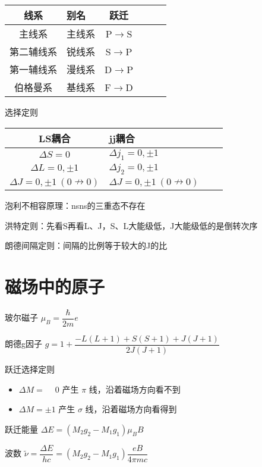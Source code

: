 \documentclass{article}
\begin{document}
\begin{multicols}{2}
\begin{tabular}[H]{@{}|Sl|Sl|Sl|}
  \hline
  线系&别名&跃迁 \\
  \hline
  主线系&主线系&P$\rightarrow$S \\
  \hline
  第二辅线系&锐线系&S$\rightarrow$P \\
  \hline
  第一辅线系&漫线系&D$\rightarrow$P \\
  \hline
  伯格曼系&基线系&F$\rightarrow$D \\
  \hline
\end{tabular}

选择定则

\begin{tabular}[H]{@{}|Sl|Sl|}
  \hline
  LS耦合 & jj耦合 \\
  \hline
  $\Delta S = 0$& $\Delta j_1 = 0, \pm 1$ \\
  \hline
  $\Delta L = 0, \pm 1$ & $\Delta j_2 = 0, \pm 1$ \\
  \hline
  $\Delta J = 0, \pm 1 \ \left( 0 \nrightarrow 0 \right)$ & $\Delta J = 0, \pm 1 \ \left( 0 \nrightarrow 0 \right)$ \\
  \hline
\end{tabular}

泡利不相容原理：nsns的三重态不存在

洪特定则：先看S再看L、J，S、L大能级低，J大能级低的是倒转次序

朗德间隔定则：间隔的比例等于较大的J的比

\section{磁场中的原子}

玻尔磁子 $\mu_B = \dfrac{\hbar}{2m} e $

朗德g因子 $g = 1 + \dfrac{- L \left( L + 1 \right) + S \left( S + 1 \right) + J \left( J + 1 \right)}{2 J \left( J + 1 \right)} $

跃迁选择定则

\begin{itemize}
\item $\Delta M = \phantom{\pm} 0$ 产生 $\pi$ 线，沿着磁场方向看不到
  \item $\Delta M = \pm 1$ 产生 $\sigma$ 线，沿着磁场方向看得到
\end{itemize}

跃迁能量 $\Delta E = \left( M_2 g_2 - M_1 g_1\right) \mu_B B$

波数 $\tilde{\nu} = \dfrac{\Delta E}{hc} = \left( M_2 g_2 - M_1 g_1 \right) \dfrac{eB}{4 \pi m c} $


\end{multicols}
\end{document}
